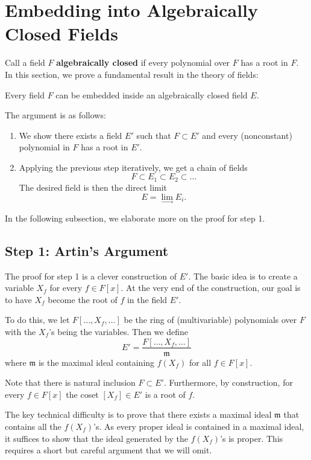 \section{Embedding into Algebraically Closed Fields}
Call a field $F$ \textbf{algebraically closed} if every polynomial over $F$ has a root in $F$. In this section, we prove a fundamental result in the theory of fields:
\begin{center}
    Every field $F$ can be embedded inside an algebraically closed field $E$.
\end{center}
The argument is as follows:
\begin{enumerate}
    \item We show there exists a field $E'$ such that $F \subset E'$ and every (nonconstant) polynomial in $F$ has a root in $E'$.

    \item Applying the previous step iteratively, we get a chain of fields
        \[
            F \subset E_1 \subset E_2 \subset \dots
        \]
        The desired field is then the direct limit
        \[
            E = \lim_{\longrightarrow} E_i.
        \]
\end{enumerate}
In the following subsection, we elaborate more on the proof for step 1.

\subsection{Step 1: Artin's Argument}
The proof for step 1 is a clever construction of $E'$. The basic idea is to create a variable $X_f$ for every $f \in F[x]$. At the very end of the construction, our goal is to have $X_f$ become the root of $f$ in the field $E'$.

To do this, we let $F[\dots, X_f, \dots]$ be the ring of (multivariable) polynomials over $F$ with the $X_f$'s being the variables. Then we define
\[
    E' = \frac{F[\dots, X_f, \dots]}{\mathfrak m}
\]
where $\mathfrak m$ is the maximal ideal containing $f(X_f)$ for all $f \in F[x]$.

Note that there is natural inclusion $F \subset E'$. Furthermore, by construction, for every $f \in F[x]$ the coset $[X_f] \in E'$ is a root of $f$.

The key technical difficulty is to prove that there exists a maximal ideal $\mathfrak m$ that contains all the $f(X_f)$'s. As every proper ideal is contained in a maximal ideal, it suffices to show that the ideal generated by the $f(X_f)$'s is proper. This requires a short but careful argument that we will omit.
